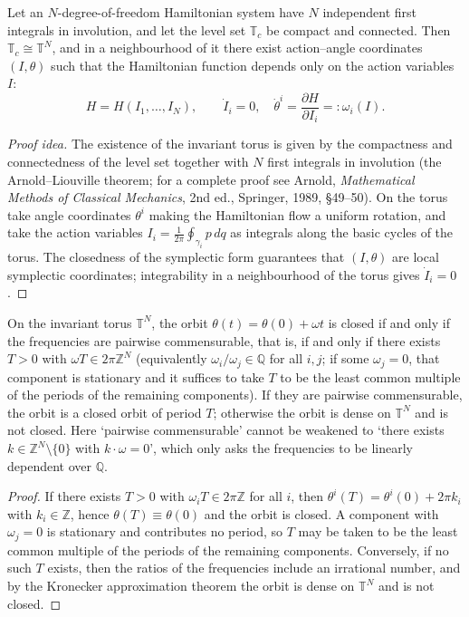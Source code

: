 \begin{theorem}\label{thm:ps_liouville_arnold}
Let an $N$-degree-of-freedom Hamiltonian system have $N$ independent first integrals in involution, and let the level set $\mathbb{T}_{c}$ be compact and connected. Then $\mathbb{T}_{c}\cong\mathbb{T}^N$, and in a neighbourhood of it there exist action--angle coordinates $(I,\theta)$ such that the Hamiltonian function depends only on the action variables $I$:
\[
H = H(I_1,\dots,I_N), \qquad \dot{I}_i = 0, \quad \dot{\theta}^i = \frac{\partial H}{\partial I_i} =: \omega_i(I).
\]
\end{theorem}

\begin{proof}[Proof idea]
The existence of the invariant torus is given by the compactness and connectedness of the level set together with $N$ first integrals in involution (the Arnold--Liouville theorem; for a complete proof see Arnold, \textit{Mathematical Methods of Classical Mechanics}, 2nd ed., Springer, 1989, \S{}49--50). On the torus take angle coordinates $\theta^i$ making the Hamiltonian flow a uniform rotation, and take the action variables $I_i = \frac{1}{2\pi}\oint_{\gamma_i}p\,dq$ as integrals along the basic cycles of the torus. The closedness of the symplectic form guarantees that $(I,\theta)$ are local symplectic coordinates; integrability in a neighbourhood of the torus gives $\dot{I}_i=0$.
\end{proof}

\begin{corollary}\label{cor:ps_torus_rotation_period}
On the invariant torus $\mathbb{T}^N$, the orbit $\theta(t) = \theta(0) + \omega t$ is closed if and only if the frequencies are pairwise commensurable, that is, if and only if there exists $T>0$ with $\omega T\in 2\pi\mathbb{Z}^N$ (equivalently $\omega_i/\omega_j\in\mathbb{Q}$ for all $i,j$; if some $\omega_j=0$, that component is stationary and it suffices to take $T$ to be the least common multiple of the periods of the remaining components). If they are pairwise commensurable, the orbit is a closed orbit of period $T$; otherwise the orbit is dense on $\mathbb{T}^N$ and is not closed. Here `pairwise commensurable' cannot be weakened to `there exists $k\in\mathbb{Z}^N\setminus\{0\}$ with $k\cdot\omega=0$', which only asks the frequencies to be linearly dependent over $\mathbb{Q}$.
\end{corollary}

\begin{proof}
If there exists $T>0$ with $\omega_i T\in 2\pi\mathbb{Z}$ for all $i$, then $\theta^i(T)=\theta^i(0)+2\pi k_i$ with $k_i\in\mathbb{Z}$, hence $\theta(T)\equiv\theta(0)$ and the orbit is closed. A component with $\omega_j=0$ is stationary and contributes no period, so $T$ may be taken to be the least common multiple of the periods of the remaining components. Conversely, if no such $T$ exists, then the ratios of the frequencies include an irrational number, and by the Kronecker approximation theorem the orbit is dense on $\mathbb{T}^N$ and is not closed.
\end{proof}

